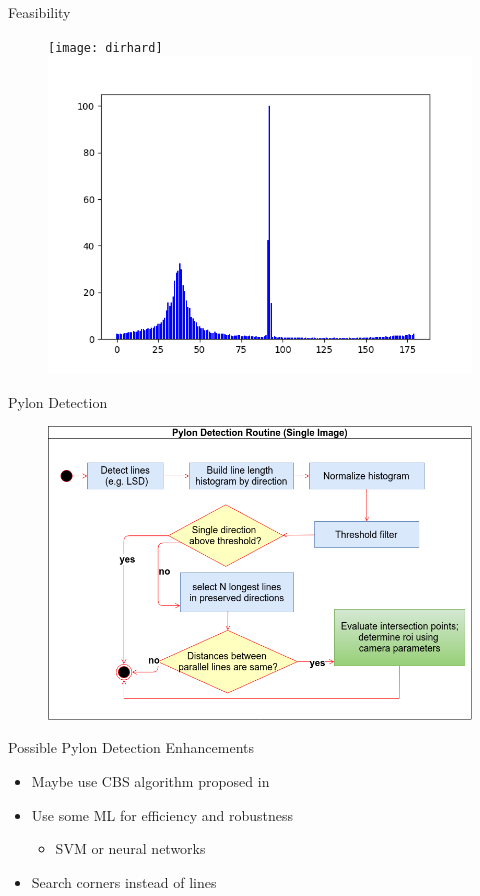 \documentclass{beamer}
\begin{document}
\begin{frame}[t, fragile]{Feasibility}
\begin{figure}
\centering
\texttt{[image: dirhard]}
\includegraphics[scale=0.4]{dirhisthard}
\end{figure}
\end{frame}



\begin{frame}[t, fragile]{Pylon Detection}
\begin{figure}
\centering
\includegraphics[scale=0.33]{DetectionSimple}
\end{figure}
\end{frame}

\begin{frame}[t, fragile]{Possible Pylon Detection Enhancements}
\begin{itemize}
\item Maybe use CBS algorithm proposed in \rbrack
\item Use some ML for efficiency and robustness
\begin{itemize} 
\item SVM or neural networks
\end{itemize}
\item Search corners instead of lines
\end{itemize}
\end{frame}
\end{document}
